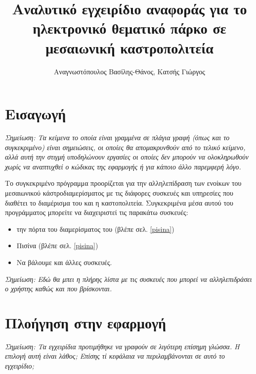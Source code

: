 \documentclass[a4paper,titlepage,twoside,12pt,leqno]{article}
\title{Αναλυτικό εγχειρίδιο αναφοράς για το ηλεκτρονικό θεματικό πάρκο σε μεσαιωνική καστροπολιτεία}
\author{Αναγνωστόπουλος Βασίλης-Θάνος, Κατσής Γιώργος}
\date{}
\begin{document}
\maketitle
\tableofcontents
\listoffigures
\listoftables
\newpage

\section{Εισαγωγή}


\emph{Σημείωση: Τα κείμενα το οποία είναι γραμμένα σε πλάγια γραφή (όπως και το συγκεκριμένο) είναι σημειώσεις, οι οποίες θα απομακρυνθούν από το τελικό κείμενο, αλλά αυτή την στιγμή υποδηλώνουν εργασίες οι οποίες δεν μπορούν να ολοκληρωθούν χωρίς να αναπτυχθεί ο κώδικας της εφαρμογής ή για κάποιο άλλο παρεμφερή λόγο.\\}

Το συγκεκριμένο πρόγραμμα προορίζεται για την αλληλεπίδραση των ενοίκων του μεσαιωνικού κάστροδιαμερίσματος με τις διάφορες συσκευές και υπηρεσίες που διαθέτει το διαμέρισμα του και η καστοπολιτεία. Συγκεκριμένα μέσα αυτού του προγράμματος μπορείτε να διαχειριστεί τις παρακάτω συσκευές:

\begin{itemize}
\item την πόρτα του διαμερίσματος του (βλέπε σελ. \ref{pisina})
\item Πισίνα (βλέπε σελ. \ref{pisina})
\item Να βάλουμε και άλλες συσκευές.
\end{itemize}

\emph{Σημείωση: Εδώ θα μπει η πλήρης λίστα με τις συσκευές που μπορεί να αλληλεπιδράσει ο χρήστης καθώς και που βρίσκονται.}

\section{Πλοήγηση στην εφαρμογή}

\emph{Σημείωση: Τα εγχειρίδια προτιμήθηκε να γραφούν σε λιγότερη επίσημη γλώσσα. Η επιλογή αυτή είναι λάθος; Επίσης τί κεφάλαια να περιλαμβάνονται σε αυτό το εγχειρίδιο;\\}
\end{document}
